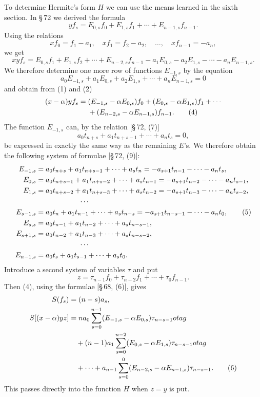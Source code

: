 \documentclass[11pt]{article}
\begin{document}
To determine Hermite's form $H$ we can use the means learned in the sixth section. In \S\,72 we derived the formula
\begin{equation}
yf_s=E_{0,s}f_0+E_{1,s}f_1+\cdots+E_{n-1,s}f_{n-1}.
\tag{1}
\end{equation}
Using the relations
\[
        xf_0=f_1-a_1,
        \quad xf_1=f_2-a_2,
        \quad\ldots,
        \quad xf_{n-1}=-a_n,
\]
we get
\begin{equation}
xyf_s=E_{0,s}f_1+E_{1,s}f_2+\cdots+E_{n-2,s}f_{n-1}
       -a_1E_{0,s}-a_2E_{1,s}-\cdots-a_nE_{n-1,s}.
\tag{2}
\end{equation}
We therefore determine one more row of functions $E_{-1,s}$ by the equation
\begin{equation}
a_0E_{-1,s}+a_1E_{0,s}+a_2E_{1,s}+\cdots+a_nE_{n-1,s}=0
\tag{3}
\end{equation}
and obtain from (1) and (2)
\begin{align}
(x-\alpha)yf_s={}&(E_{-1,s}-\alpha E_{0,s})f_0+(E_{0,s}-\alpha E_{1,s})f_1+\cdots\notag\\
&+(E_{n-2,s}-\alpha E_{n-1,s})f_{n-1}.
\tag{4}
\end{align}
The function $E_{-1,s}$ can, by the relation [\S\,72, (7)]
\[
        a_0t_{n+s}+a_1t_{n+s-1}+\cdots+a_nt_s=0,
\]
be expressed in exactly the same way as the remaining $E$'s. We therefore obtain the following system of formulae [\S\,72, (9)]:
\begin{align}
E_{-1,s}&=a_0t_{n+s}+a_1t_{n+s-1}+\cdots+a_st_n
          =-a_{s+1}t_{n-1}-\cdots-a_nt_s,\notag\\
E_{0,s}&=a_0t_{n+s-1}+a_1t_{n+s-2}+\cdots+a_st_{n-1}
          =-a_{s+1}t_{n-2}-\cdots-a_nt_{s-1},\notag\\
E_{1,s}&=a_0t_{n+s-2}+a_1t_{n+s-3}+\cdots+a_st_{n-2}
          =-a_{s+1}t_{n-3}-\cdots-a_nt_{s-2},\notag\\
&\hspace{6em}\cdots\notag\\
E_{s-1,s}&=a_0t_n+a_1t_{n-1}+\cdots+a_st_{n-s}
          =-a_{s+1}t_{n-s-1}-\cdots-a_nt_0,\tag{5}\\
E_{s,s}&=a_0t_{n-1}+a_1t_{n-2}+\cdots+a_st_{n-s-1},\notag\\
E_{s+1,s}&=a_0t_{n-2}+a_1t_{n-3}+\cdots+a_st_{n-s-2},\notag\\
&\hspace{6em}\cdots\notag\\
E_{n-1,s}&=a_0t_s+a_1t_{s-1}+\cdots+a_st_0.
\notag
\end{align}
Introduce a second system of variables $\tau$ and put
\[
        z=\tau_{n-1}f_0+\tau_{n-2}f_1+\cdots+\tau_0f_{n-1}.
\]
Then (4), using the formulae [\S\,68, (6)], gives
\begin{align}
S(f_s)&=(n-s)a_s,
\notag\\
S[(x-\alpha)yz]
&=na_0\sum_{s=0}^{n-1}(E_{-1,s}-\alpha E_{0,s})\tau_{n-s-1}
otag\\
&\quad +(n-1)a_1\sum_{s=0}^{n-2}(E_{0,s}-\alpha E_{1,s})\tau_{n-s-1}
otag\\
&\quad+\cdots+a_{n-1}\sum_{s=0}^{0}(E_{n-2,s}-\alpha E_{n-1,s})\tau_{n-s-1}.
\tag{6}
\end{align}
This passes directly into the function $H$ when $z=y$ is put.
\end{document}
